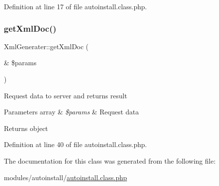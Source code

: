 Definition at line 17 of file autoinstall.\+class.\+php.

\mbox{\label{classXmlGenerater_a2c76cbd93596f5f7d48ff2ff0b9213ce}} 
\subsubsection{\texorpdfstring{get\+Xml\+Doc()}{getXmlDoc()}}
{\footnotesize\ttfamily Xml\+Generater\+::get\+Xml\+Doc (\begin{DoxyParamCaption}\item[{\&}]{\$params }\end{DoxyParamCaption})}

Request data to server and returns result


\begin{DoxyParams}[1]{Parameters}
array & {\em \$params} & Request data \\
\hline
\end{DoxyParams}
\begin{DoxyReturn}{Returns}
object 
\end{DoxyReturn}


Definition at line 40 of file autoinstall.\+class.\+php.



The documentation for this class was generated from the following file\+:\begin{DoxyCompactItemize}
\item 
modules/autoinstall/\hyperlink{autoinstall_8class_8php}{autoinstall.\+class.\+php}\end{DoxyCompactItemize}
